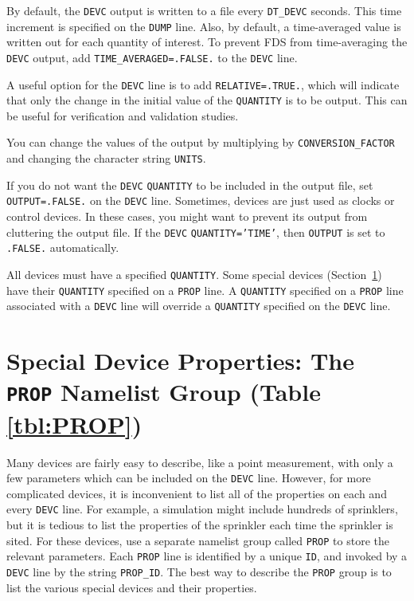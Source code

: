 \documentclass[11pt]{book}
\newcommand{\ct}{\tt\small}
\begin{document}
By default, the {\ct DEVC} output is written to a file every {\ct DT\_DEVC} seconds.
This time increment is specified on the {\ct DUMP} line. Also, by default,
a time-averaged value is written out for each quantity of interest. To prevent FDS from time-averaging the {\ct DEVC} output, add
{\ct TIME\_AVERAGED=.FALSE.} to the {\ct DEVC} line.

A useful option for the {\ct DEVC} line is to add {\ct RELATIVE=.TRUE.}, which will indicate that only the change in
the initial value of the {\ct QUANTITY} is to be output. This can be useful for verification and validation studies.

You can change the values of the output by multiplying by {\ct CONVERSION\_FACTOR} and changing the character string {\ct UNITS}.

If you do not want the {\ct DEVC} {\ct QUANTITY} to be included in the output file, set {\ct OUTPUT=.FALSE.} on the {\ct DEVC} line. Sometimes, devices are just used as clocks or control devices. In these cases, you might want to prevent its output from cluttering the output file. If the {\ct DEVC} {\ct QUANTITY='TIME'}, then {\ct OUTPUT} is set to {\ct .FALSE.} automatically.


\begin{warning}
All devices must have a specified {\ct QUANTITY}.  Some special devices (Section~\ref{info:PROP}) have their {\ct QUANTITY}
specified on a {\ct PROP} line.
A {\ct QUANTITY} specified on a {\ct PROP} line associated with a {\ct DEVC} line will override a {\ct QUANTITY}
specified on the {\ct DEVC} line.
\end{warning}


\newpage

\section{Special Device Properties: The \texorpdfstring{{\tt PROP}}{PROP} Namelist Group (Table \ref{tbl:PROP})}
\label{info:PROP}

Many devices are fairly easy to describe, like a point measurement, with only a few parameters which can be included on the
{\ct DEVC} line. However, for more complicated devices, it is inconvenient to list all of the properties on each and every
{\ct DEVC} line. For example, a simulation might include hundreds of sprinklers, but it is tedious to list the properties of the
sprinkler each time the sprinkler is sited. For these devices, use a separate namelist group called {\ct PROP} to store the relevant parameters.
Each {\ct PROP} line is identified by a unique {\ct ID}, and invoked by a {\ct DEVC} line by the string {\ct PROP\_ID}.
The best way to describe the {\ct PROP} group is to list the various special devices and their properties.
\end{document}
